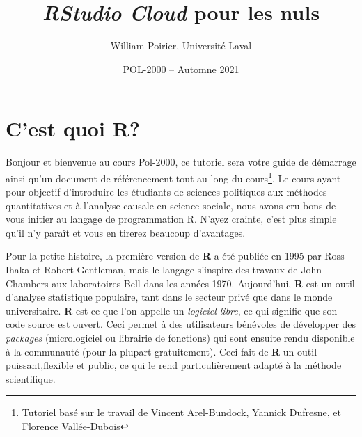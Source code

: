 \documentclass[10.5pt,a4paper]{article}
\title{\textbf{\emph{RStudio Cloud}} pour les nuls}
\author{William Poirier, Université Laval}
\date{POL-2000 -- Automne 2021}
\begin{document}
 

\restoregeometry %
\nopagecolor%

\tableofcontents

\pagebreak

\section{C'est quoi R?}
Bonjour et bienvenue au cours Pol-2000, ce tutoriel sera votre guide de démarrage ainsi qu'un document de référencement tout au long du cours\footnote{Tutoriel basé sur le travail de Vincent Arel-Bundock, Yannick Dufresne, et Florence Vallée-Dubois}. Le cours ayant pour objectif d'introduire les étudiants de sciences politiques aux méthodes quantitatives et à l'analyse causale en science sociale, nous avons cru bons de vous initier au langage de programmation R. N'ayez crainte, c'est plus simple qu'il n'y paraît et vous en tirerez beaucoup d'avantages. 

Pour la petite histoire, la première version de \textbf{R} a été publiée en 1995 par Ross Ihaka et Robert Gentleman, mais le langage s'inspire des travaux de John Chambers aux laboratoires Bell dans les années 1970. Aujourd'hui, \textbf{R} est un outil d'analyse statistique populaire, tant dans le secteur privé que dans le monde universitaire. \textbf{R} est-ce que l'on appelle un \textit{logiciel libre}, ce qui signifie que son code source est ouvert. Ceci permet à des utilisateurs bénévoles de développer des \textit{packages} (micrologiciel ou librairie de fonctions) qui sont ensuite rendu disponible à la communauté (pour la plupart gratuitement). Ceci fait de \textbf{R} un outil puissant,flexible et public, ce qui le rend particulièrement adapté à la méthode scientifique. 
\end{document}
